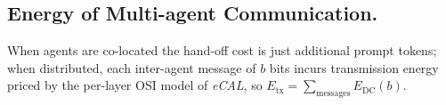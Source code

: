 \documentclass[journal]{IEEEtran}
\newcommand{\ecal}{\textit{eCAL}}
\begin{document}
\subsection{Energy of Multi-agent Communication.} 
When agents are co-located the hand-off cost is just additional
prompt tokens; when distributed, each inter-agent message of $b$ bits incurs transmission energy
priced by the per-layer OSI model of \ecal{}, so $E_{\mathrm{tx}}=\sum_{\text{messages}}E_{\mathrm{DC}}(b)$.


% 
\end{document}
